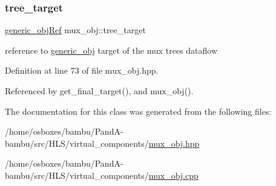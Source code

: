 \subsubsection{\texorpdfstring{tree\+\_\+target}{tree\_target}}
{\footnotesize\ttfamily \hyperlink{generic__obj_8hpp_acb533b2ef8e0fe72e09a04d20904ca81}{generic\+\_\+obj\+Ref} mux\+\_\+obj\+::tree\+\_\+target\hspace{0.3cm}{\ttfamily [private]}}



reference to \hyperlink{classgeneric__obj}{generic\+\_\+obj} target of the mux tree\textquotesingle{}s dataflow 



Definition at line 73 of file mux\+\_\+obj.\+hpp.



Referenced by get\+\_\+final\+\_\+target(), and mux\+\_\+obj().



The documentation for this class was generated from the following files\+:\begin{DoxyCompactItemize}
\item 
/home/osboxes/bambu/\+Pand\+A-\/bambu/src/\+H\+L\+S/virtual\+\_\+components/\hyperlink{mux__obj_8hpp}{mux\+\_\+obj.\+hpp}\item 
/home/osboxes/bambu/\+Pand\+A-\/bambu/src/\+H\+L\+S/virtual\+\_\+components/\hyperlink{mux__obj_8cpp}{mux\+\_\+obj.\+cpp}\end{DoxyCompactItemize}
